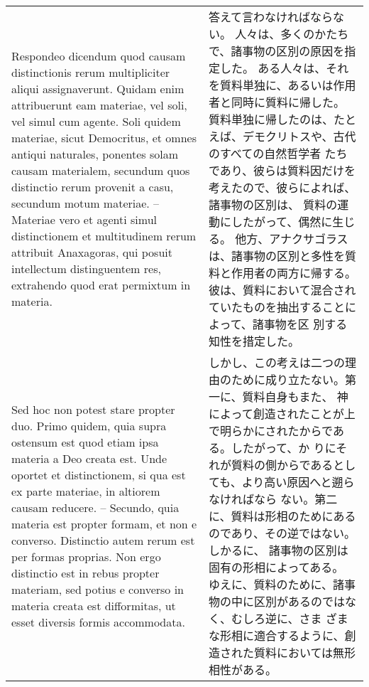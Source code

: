 \documentclass[10pt]{jsarticle} %
\begin{document}
\begin{longtable}{p{21em}p{21em}}
\\





{\sc Respondeo dicendum} quod causam distinctionis
 rerum multipliciter aliqui assignaverunt. Quidam enim attribuerunt eam
 materiae, vel soli, vel simul cum agente. Soli quidem materiae, sicut
 Democritus, et omnes antiqui naturales, ponentes solam causam
 materialem, secundum quos distinctio rerum provenit a casu, secundum
 motum materiae. -- Materiae vero et agenti simul distinctionem et
 multitudinem rerum attribuit Anaxagoras, qui posuit intellectum
 distinguentem res, extrahendo quod erat permixtum in materia. 



&

答えて言わなければならない。
人々は、多くのかたちで、諸事物の区別の原因を指定した。
ある人々は、それを質料単独に、あるいは作用者と同時に質料に帰した。
質料単独に帰したのは、たとえば、デモクリトスや、古代のすべての自然哲学者
 たちであり、彼らは質料因だけを考えたので、彼らによれば、諸事物の区別は、
 質料の運動にしたがって、偶然に生じる。
他方、アナクサゴラスは、諸事物の区別と多性を質料と作用者の両方に帰する。
 彼は、質料において混合されていたものを抽出することによって、諸事物を区
 別する知性を措定した。

\\



Sed hoc
 non potest stare propter duo. Primo quidem, quia supra ostensum est
 quod etiam ipsa materia a Deo creata est. Unde oportet et
 distinctionem, si qua est ex parte materiae, in altiorem causam
 reducere. -- Secundo, quia materia est propter formam, et non e
 converso. Distinctio autem rerum est per formas proprias. Non ergo
 distinctio est in rebus propter materiam, sed potius e converso in
 materia creata est difformitas, ut esset diversis formis
 accommodata. 
&

しかし、この考えは二つの理由のために成り立たない。第一に、質料自身もまた、
 神によって創造されたことが上で明らかにされたからである。したがって、か
 りにそれが質料の側からであるとしても、より高い原因へと遡らなければなら
 ない。第二に、質料は形相のためにあるのであり、その逆ではない。しかるに、
 諸事物の区別は固有の形相によってある。
ゆえに、質料のために、諸事物の中に区別があるのではなく、むしろ逆に、さま
 ざまな形相に適合するように、創造された質料においては無形相性がある。

\\


\end{longtable}
\end{document}
